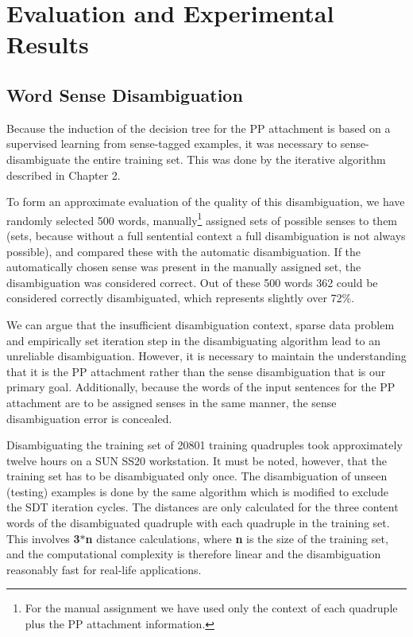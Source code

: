 \section{Evaluation and Experimental Results}

\subsection{Word Sense Disambiguation}

Because the induction of the decision tree for the PP attachment is based on a supervised learning from sense-tagged examples, it was necessary to sense-disambiguate the entire training set. This was done by the iterative algorithm described in Chapter 2. 

To form an approximate evaluation of the quality of this disambiguation, we have randomly selected 500 words, manually\footnote{For the manual assignment we have used only the context of each quadruple plus the PP attachment information.}
 assigned sets of possible senses to them (sets, because without a full sentential context a full disambiguation is not always possible), and compared these with the automatic disambiguation. If the automatically chosen sense was present in the manually assigned set, the disambiguation was considered correct. Out of these 500 words 362 could be considered correctly disambiguated, which represents slightly over 72\%.

We can argue that the insufficient disambiguation context, sparse data problem and empirically set iteration step in the disambiguating algorithm lead to an unreliable disambiguation. However, it is necessary to maintain the understanding that it is the PP attachment rather than the sense disambiguation that is our primary goal. Additionally, because the words of the input sentences for the PP attachment are to be assigned senses in the same manner, the sense disambiguation error is concealed.

Disambiguating the training set of 20801 training quadruples took approximately twelve hours on a SUN SS20 workstation. It must be noted, however, that the training set has to be disambiguated only once. The disambiguation of unseen (testing) examples is done by the same algorithm which is modified to exclude the SDT iteration cycles. The distances are only calculated for the three content words of the disambiguated quadruple with each quadruple in the training set. This involves {\bf 3$*$n} distance calculations, where {\bf n} is the size of the training set, and the computational complexity is therefore linear and the disambiguation reasonably fast for real-life applications.

